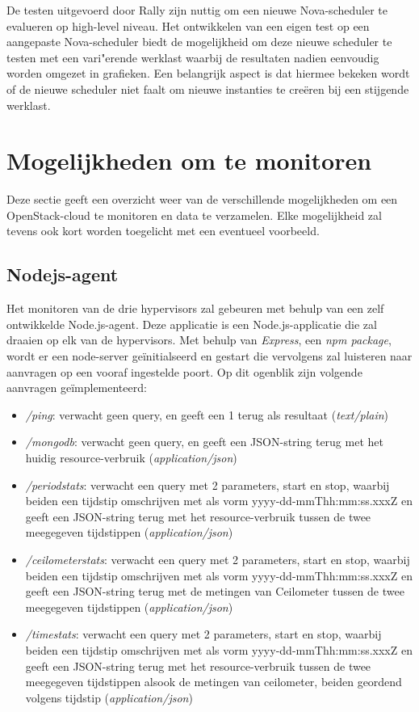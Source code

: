 De testen uitgevoerd door Rally zijn nuttig om een nieuwe Nova-scheduler te evalueren op high-level niveau. Het ontwikkelen van een eigen test op een aangepaste Nova-scheduler biedt de mogelijkheid om deze nieuwe scheduler te testen met een vari"erende werklast waarbij de resultaten nadien eenvoudig worden omgezet in grafieken. Een belangrijk aspect is dat hiermee bekeken wordt of de nieuwe scheduler niet faalt om nieuwe instanties te creëren bij een stijgende werklast.

\section{Mogelijkheden om te monitoren}

Deze sectie geeft een overzicht weer van de verschillende mogelijkheden om een OpenStack-cloud te monitoren en data te verzamelen. Elke mogelijkheid zal tevens ook kort worden toegelicht met een eventueel voorbeeld.

\subsection{Nodejs-agent}
\label{sec:nodejs-agent}

Het monitoren van de drie hypervisors zal gebeuren met behulp van een zelf ontwikkelde Node.js-agent. Deze applicatie is een Node.js-applicatie die zal draaien op elk van de hypervisors. Met behulp van \textit{Express}, een \textit{npm package}, wordt er een node-server geïnitialseerd en gestart die vervolgens zal luisteren naar aanvragen op een vooraf ingestelde poort. Op dit ogenblik zijn volgende aanvragen geïmplementeerd:

\begin{itemize}
  \item \textit{/ping}: verwacht geen query, en geeft een 1 terug als resultaat (\textit{text/plain})
  \item \textit{/mongodb}: verwacht geen query, en geeft een JSON-string terug met het huidig resource-verbruik (\textit{application/json})
  \item \textit{/periodstats}: verwacht een query met 2 parameters, start en stop, waarbij beiden een tijdstip omschrijven met als vorm yyyy-dd-mmThh:mm:ss.xxxZ en geeft een JSON-string terug met het resource-verbruik tussen de twee meegegeven tijdstippen (\textit{application/json})
  \item \textit{/ceilometerstats}: verwacht een query met 2 parameters, start en stop, waarbij beiden een tijdstip omschrijven met als vorm yyyy-dd-mmThh:mm:ss.xxxZ en geeft een JSON-string terug met de metingen van Ceilometer tussen de twee meegegeven tijdstippen (\textit{application/json})
  \item \textit{/timestats}: verwacht een query met 2 parameters, start en stop, waarbij beiden een tijdstip omschrijven met als vorm yyyy-dd-mmThh:mm:ss.xxxZ en geeft een JSON-string terug met het resource-verbruik tussen de twee meegegeven tijdstippen alsook de metingen van ceilometer, beiden geordend volgens tijdstip (\textit{application/json})
\end{itemize}

